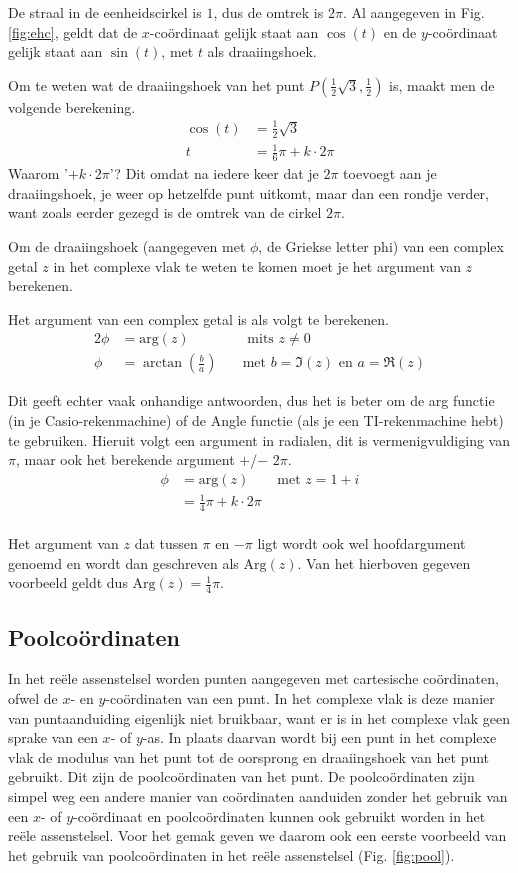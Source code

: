 \documentclass[11pt,fleqn]{book} %
\begin{document}
De straal in de eenheidscirkel is $1$, dus de omtrek is $2\pi$. Al aangegeven in Fig. \ref{fig:ehc}, geldt dat de $x$-coördinaat gelijk staat aan $\cos{(t)}$ en de $y$-coördinaat gelijk staat aan $\sin{(t)}$, met $t$ als draaiingshoek.

Om te weten wat de draaiingshoek van het punt $P(\frac{1}{2}\sqrt{3},\frac{1}{2})$ is, maakt men de volgende berekening.
\begin{align*}
\cos{(t)}&=\frac{1}{2}\sqrt{3}\\
t&=\frac{1}{6}\pi+k\cdot 2\pi
\end{align*}
Waarom '$+ k\cdot2\pi$'? Dit omdat na iedere keer dat je $2\pi$ toevoegt aan je draaiingshoek, je weer op hetzelfde punt uitkomt, maar dan een rondje verder, want zoals eerder gezegd is de omtrek van de cirkel $2\pi$.

Om de draaiingshoek (aangegeven met $\phi$, de Griekse letter phi) van een complex getal $z$ in het complexe vlak te weten te komen moet je het argument van $z$ berekenen.
\begin{definition}
Het argument van een complex getal is als volgt te berekenen.
\begin{alignat*}{2}
\phi &=\text{arg}(z)\quad &\text{ mits }z\neq 0\\
\phi &= \arctan\left(\frac{b}{a}\right)\quad &\text{met } b=\Im(z) \text{ en } a=\Re(z)
\end{alignat*}
\end{definition}
Dit geeft echter vaak onhandige antwoorden, dus het is beter om de arg functie (in je Casio-rekenmachine) of de Angle functie (als je een TI-rekenmachine hebt) te gebruiken. Hieruit volgt een argument in radialen, dit is vermenigvuldiging van $\pi$, maar ook het berekende argument $+$/$-$ $2\pi$.
\begin{align*}
\phi&=\text{arg}(z)\qquad\text{met } z=1+i\\
&=\frac{1}{4}\pi + k\cdot 2\pi\\
\end{align*}

Het argument van $z$ dat tussen $\pi$ en $-\pi$ ligt wordt ook wel hoofdargument genoemd en wordt dan geschreven als $\text{Arg}(z)$. Van het hierboven gegeven voorbeeld geldt dus $\text{Arg}(z)=\frac{1}{4} \pi$.

\subsection{Poolcoördinaten}
In het reële assenstelsel worden punten aangegeven met cartesische coördinaten, ofwel de $x$- en $y$-coördinaten van een punt. In het complexe vlak is deze manier van puntaanduiding eigenlijk niet bruikbaar, want er is in het complexe vlak geen sprake van een $x$- of $y$-as. In plaats daarvan wordt bij een punt in het complexe vlak de modulus van het punt tot de oorsprong en draaiingshoek van het punt gebruikt. Dit zijn de poolcoördinaten van het punt. De poolcoördinaten zijn simpel weg een andere manier van coördinaten aanduiden zonder het gebruik van een $x$- of $y$-coördinaat en poolcoördinaten kunnen ook gebruikt worden in het reële assenstelsel. Voor het gemak geven we daarom ook een eerste voorbeeld van het gebruik van poolcoördinaten in het reële assenstelsel (Fig. \ref{fig:pool}).
\end{document}
